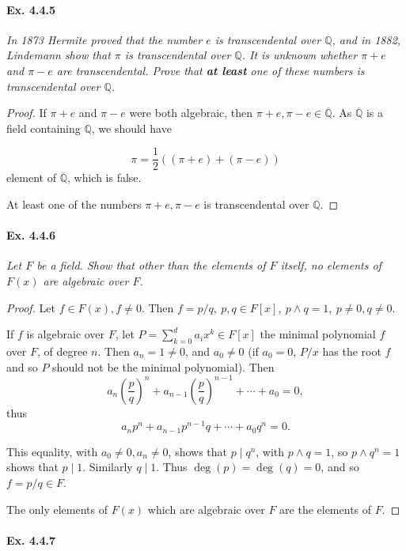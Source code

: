 \documentclass[11pt,a4paper]{article}
\newcommand{\Q}{\mathbb{Q}}
\begin{document}
\paragraph{Ex. 4.4.5}

{\it In 1873 Hermite proved that the number $e$ is transcendental over $\Q$, and in 1882, Lindemann show that $\pi$ is transcendental over $\Q$. It is unknown whether $\pi+e$ and $\pi-e$ are transcendental. Prove that {\bf at least} one of these numbers is transcendental over $\Q$.
}

\begin{proof}
If $\pi+e$ and $\pi -e$ were both algebraic, then  $\pi+e,\pi -e \in \overline{\Q}$.  As $\overline{\Q}$ is a field containing $\Q$, we should have

$$\pi = \frac{1}{2}\left( (\pi+e) + (\pi-e)\right) $$
element of $\overline{\Q}$, which is false.

At least one of the numbers $\pi+e,\pi-e$ is transcendental over $\Q$.

\end{proof}

\paragraph{Ex. 4.4.6}

{\it Let $F$ be a field. Show that other than the elements of $F$ itself, no elements of $F(x)$ are algebraic over $F$.
}

\begin{proof}
Let $f \in F(x), f\neq 0$. Then $f =p/q,\  p,q \in F[x], \ p \wedge q = 1,\  p\neq 0, q\neq 0$.

If $f$ is algebraic over $F$, let $P  = \sum_{k=0}^d a_i x^k \in F[x]$ the minimal polynomial $f$ over $F$, of degree $n$. Then $a_n = 1 \neq 0$, and $a_0 \neq 0$ (if $a_0 = 0$,  $P/x$ has the root $f$ and so $P$ should not be the minimal polynomial). Then 
$$a_{n}\left ( \frac{p}{q}\right )^n+a_{n-1}\left ( \frac{p}{q}\right )^{n-1}+\cdots+a_0 = 0,$$
thus   $$a_n p^n + a_{n-1} p^{n-1}q+\cdots+a_0 q^n = 0.$$

This equality, with $a_0 \neq 0, a_n \neq 0$, shows that $p \mid q^n$, with $p\wedge q= 1$, so $p \wedge q^n=1$ shows that $p \mid 1$. Similarly $q\mid 1$. Thus $\deg(p) =\deg(q) =0$, and so $f=p/q \in F$.

The only elements of $F(x)$ which are algebraic over $F$ are the elements of $F$.
\end{proof}

\paragraph{Ex. 4.4.7} 
\end{document}

